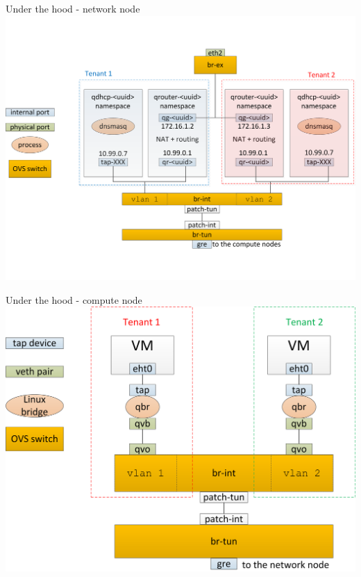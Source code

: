 \documentclass[english,serif,mathserif,xcolor=pdftex,dvipsnames,table]{beamer}
\begin{document}
\begin{frame}{Under the hood - network node}
  \includegraphics[width=\linewidth]{under-the-hood-neutron-server}
\end{frame}

\begin{frame}
  {Under the hood - compute node}
  \includegraphics[width=\linewidth]{under-the-hood-compute}
\end{frame}
\end{document}
